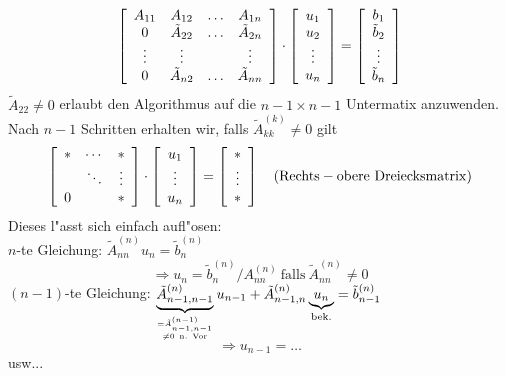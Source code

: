 \documentclass{scrartcl}
\begin{document}
$$
\left[ 
\begin{array}{c c c c }
A_{11} & A_{12} & \ldots & A_{1n} \\
0      & \tilde{A}_{22} & \ldots & \tilde{A}_{2n} \\
\vdots & \vdots &        & \vdots \\
0      & \tilde{A}_{n2}  & \ldots & \tilde{A}_{nn}
\end{array}
\right]
\cdot 
\left[
\begin{array}{c}
u_1 \\ u_2 \\ \vdots \\ u_n
\end{array}
\right]
= 
\left[
\begin{array}{c}
b_1 \\ \tilde{b}_2 \\ \vdots \\ \tilde{b}_n
\end{array}
\right]$$
$\tilde{A}_{22} \neq 0$ erlaubt den Algorithmus auf die $n-1 \times n-1$ Untermatix anzuwenden. Nach $n-1$ Schritten erhalten wir, falls $\tilde{A}_{kk}^{(k)} \neq 0$ gilt
$$ \left[
\begin{array}{c c c}
* & \cdots & * \\
& \ddots & \vdots \\
0 & & *
\end{array}
\right]
\cdot
\left[
\begin{array}{c}
u_1 \\ \vdots \\ u_n
\end{array}
\right]
= 
\left[
\begin{array}{c}
* \\ \vdots \\ *
\end{array}
\right] \quad (\mathrm{Rechts-obere \ Dreiecksmatrix})
$$
Dieses l"asst sich einfach aufl"osen: \\
$n$-te Gleichung: $\tilde{A}_{nn}^{(n)} u_n = \tilde{b}_n^{(n)}$ 
$$\Rightarrow u_n = \tilde{b}_n^{(n)} / A_{nn}^{(n)} \ \mathrm{falls} \  \tilde{A}_{nn}^{(n)} \neq 0$$
$(n-1)$-te Gleichung: $\underbrace{\tilde{A}_{n-1,n-1}^{(n)}}_{\genfrac{}{}{0pt}{}{=\tilde{A}_{n-1,n-1}^{(n-1)}}{ \neq 0 \mathrm{\ n. \ Vor}}} u_{n-1} + \tilde{A}_{n-1,n}^{(n)} \underbrace{u_n}_{\mathrm{bek.}} = \tilde{b}_{n-1}^{(n)}$ \\
$$\Rightarrow u_{n-1} = \ldots$$ usw...
\end{document}
